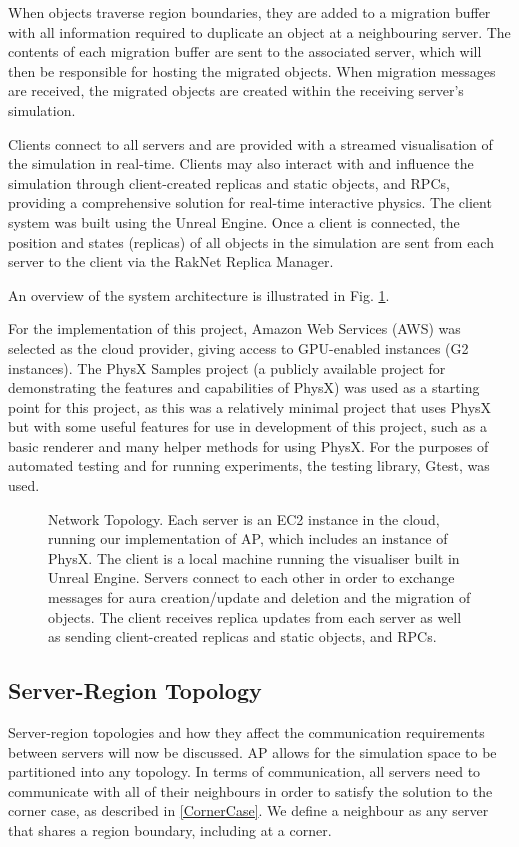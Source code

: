 When objects traverse region boundaries, they are added to a migration buffer with all information required to duplicate an object at a neighbouring server. The contents of each migration buffer are sent to the associated server, which will then be responsible for hosting the migrated objects. When migration messages are received, the migrated objects are created within the receiving server's simulation.

Clients connect to all servers and are provided with a streamed visualisation of the simulation in real-time. Clients may also interact with and influence the simulation through client-created replicas and static objects, and RPCs, providing a comprehensive solution for real-time interactive physics. The client system was built using the Unreal Engine. Once a client is connected, the position and states (replicas) of all objects in the simulation are sent from each server to the client via the RakNet Replica Manager.

An overview of the system architecture is illustrated in Fig. \ref{SystemOverview}.

For the implementation of this project, Amazon Web Services (AWS) was selected as the cloud provider, giving access to GPU-enabled instances (G2 instances). The PhysX Samples project (a publicly available project for demonstrating the features and capabilities of PhysX) was used as a starting point for this project, as this was a relatively minimal project that uses PhysX but with some useful features for use in development of this project, such as a basic renderer and many helper methods for using PhysX. For the purposes of automated testing and for running experiments, the testing library, Gtest, was used.

\begin{figure}[t]
	\centering
	\scalebox{1.5}{}
	\caption{Network Topology. Each server is an EC2 instance in the cloud, running our implementation of AP, which includes an instance of PhysX. The client is a local machine running the visualiser built in Unreal Engine. Servers connect to each other in order to exchange messages for aura creation/update and deletion and the migration of objects. The client receives replica updates from each server as well as sending client-created replicas and static objects, and RPCs.}
	\label{SystemOverview}
\end{figure}

\subsection{Server-Region Topology}
Server-region topologies and how they affect the communication requirements between servers will now be discussed. 
AP allows for the simulation space to be partitioned into any topology. In terms of communication, all servers need to communicate with all of their neighbours in order to satisfy the solution to the corner case, as described in \ref{CornerCase}. We define a neighbour as any server that shares a region boundary, including at a corner. 

